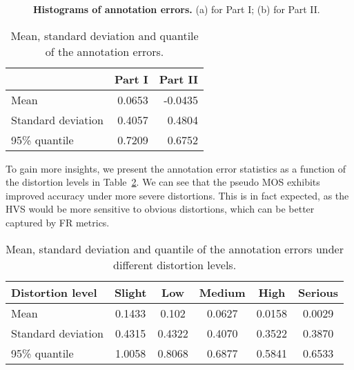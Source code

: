 \documentclass[acmsmall]{acmart}
\begin{document}
\begin{figure}[htbp]
\centering
  \centering
\caption{{\bf Histograms of annotation errors.} (a) for Part I; (b) for Part II.}
  \label{histogramsMOSandPseusoMOS}
\end{figure}

\begin{table}[htbp]
  \centering
  \caption{Mean, standard deviation and  quantile of the annotation errors.}
  \begin{footnotesize}
    \begin{tabular}{l|r|r}
    \hline
          & \multicolumn{1}{l|}{Part I} & \multicolumn{1}{l}{Part II} \\
    \hline
    Mean  & 0.0653 & -0.0435 \\
    \hline
    Standard deviation & 0.4057 & 0.4804 \\
    \hline
    95\% quantile & 0.7209 & 0.6752 \\
    \hline
    \end{tabular}\end{footnotesize}
  \label{StatisticalAnalysis}\end{table}

\par To gain more insights, we present the annotation error statistics as a function of the distortion levels in Table~\ref{StatisticalWithDisLevel}. We can see that the pseudo MOS exhibits improved accuracy under more severe distortions. This is in fact expected, as the HVS would be more sensitive to obvious distortions, which can be better captured by FR metrics.

\begin{table}[htbp]
  \centering
  \caption{Mean, standard deviation and  quantile of the annotation errors under different distortion levels.}
  \begin{footnotesize}
    \begin{tabular}{l|c|c|c|c|c}
    \hline
    Distortion level & Slight & Low   & Medium & High  & Serious \\
    \hline
    Mean  & 0.1433 & 0.102 & 0.0627 & 0.0158 & 0.0029 \\
    \hline
    Standard deviation   & 0.4315 & 0.4322 & 0.4070 & 0.3522 & 0.3870 \\
    \hline
    95\% quantile & 1.0058 & 0.8068 & 0.6877 & 0.5841 & 0.6533 \\
    \hline
    \end{tabular}\end{footnotesize}
  \label{StatisticalWithDisLevel}\end{table}
\end{document}
